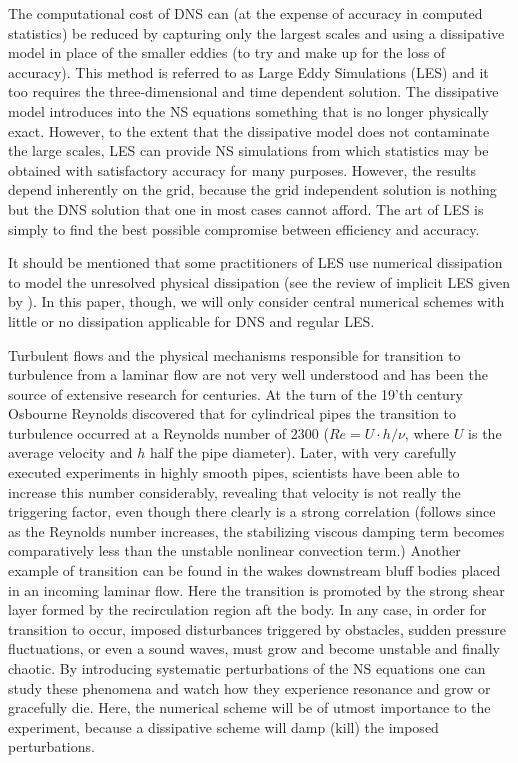 The computational cost of DNS can (at the expense of accuracy in
computed statistics) be reduced by capturing only the largest scales
and using a dissipative model in place of the smaller eddies (to try
and make up for the loss of accuracy). This method is referred to as
Large Eddy Simulations (LES) and it too requires the three-dimensional
and time dependent solution. The dissipative model introduces into the
NS equations something that is no longer physically exact. However,
to the extent that the dissipative model does not contaminate the
large scales, LES can provide NS simulations from which statistics
may be obtained with satisfactory accuracy for many purposes. However,
the results depend inherently on the grid, because the grid independent
solution is nothing but the DNS solution that one in most cases cannot
afford. The art of LES is simply to find the best possible compromise
between efficiency and accuracy.

It should be mentioned that some practitioners of LES use numerical
dissipation to model the unresolved physical dissipation (see the review
of implicit LES given by \citet{Iles}). In this paper, though, we will
only consider central numerical schemes with little or no dissipation
applicable for DNS and regular LES.

Turbulent flows and the physical mechanisms responsible for transition
to turbulence from a laminar flow are not very well understood and has
been the source of extensive research for centuries. At the turn of the
19'th century Osbourne Reynolds discovered that for cylindrical pipes
the transition to turbulence occurred at a Reynolds number of 2300
($Re=U\cdot h/\nu$, where $U$ is the average velocity and $h$ half
the pipe diameter). Later, with very carefully executed experiments in
highly smooth pipes, scientists have been able to increase this number
considerably, revealing that velocity is not really the triggering factor,
even though there clearly is a strong correlation (follows since as the
Reynolds number increases, the stabilizing viscous damping term becomes
comparatively less than the unstable nonlinear convection term.) Another
example of transition can be found in the wakes downstream bluff bodies
placed in an incoming laminar flow. Here the transition is promoted by the
strong shear layer formed by the recirculation region aft the body. In any
case, in order for transition to occur, imposed disturbances triggered
by obstacles, sudden pressure fluctuations, or even a sound waves, must
grow and become unstable and finally chaotic. By introducing systematic
perturbations of the NS equations one can study these phenomena and
watch how they experience resonance and grow or gracefully die. Here,
the numerical scheme will be of utmost importance to the experiment,
because a dissipative scheme will damp (kill) the imposed perturbations.


